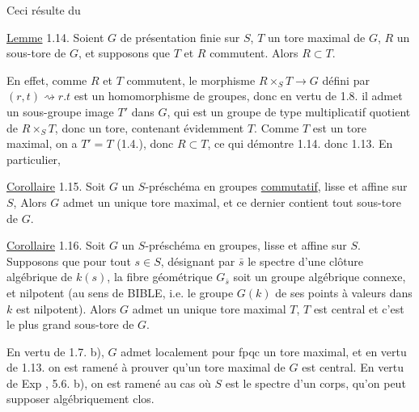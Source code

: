 Ceci résulte du 

\uline{Lemme} 1.14. Soient $G$  de présentation finie sur $S$, $T$ un tore maximal de $G$,  $R$ un sous-tore de $G$, et supposons que $T$ et $R$ commutent. Alors $R\subset T$.

En effet, comme $R$ et $T$ commutent, le morphisme $R\times_S T\longrightarrow G$ défini  par $(r,t)\rightsquigarrow r.t$ est un homomorphisme de groupes, donc en vertu de 1.8. il admet un sous-groupe image $T'$ dans $G$, qui est un groupe de type multiplicatif quotient de $R\times_S T$, donc un tore, contenant évidemment $T$. Comme $T$ est un tore maximal, on a $T'=T$ (1.4.), donc $R\subset T$,  ce qui démontre 1.14. donc 1.13. En particulier, 

\uline{Corollaire} 1.15. Soit $G$ un $S$-préschéma en groupes  \uline{commutatif}, lisse et affine sur $S$,  Alors $G$ admet un unique tore maximal, et ce  dernier contient tout sous-tore de $G$.

\uline{Corollaire} 1.16. Soit $G$ un $S$-préschéma en groupes, lisse et affine sur $S$. Supposons que pour tout $s\in S$, désignant par $\bar s$ le spectre d'une clôture algébrique  de $k(s)$, la fibre géométrique $G_{\bar s}$ soit un groupe algébrique connexe, et nilpotent (au sens de BIBLE, i.e. le groupe $G(k)$ de ses points à valeurs dans $k$ est nilpotent).  Alors $G$ admet un unique tore maximal $T$,  $T$ est central et c'est le plus grand sous-tore de $G$.

En vertu de 1.7. b), $G$ admet localement pour fpqc un tore maximal, et en vertu de 1.13. on est ramené à prouver qu'un tore maximal de $G$ est central. En vertu de Exp , 5.6. b), on est ramené au cas où $S$ est le spectre d'un corps, qu'on peut supposer algébriquement clos.

